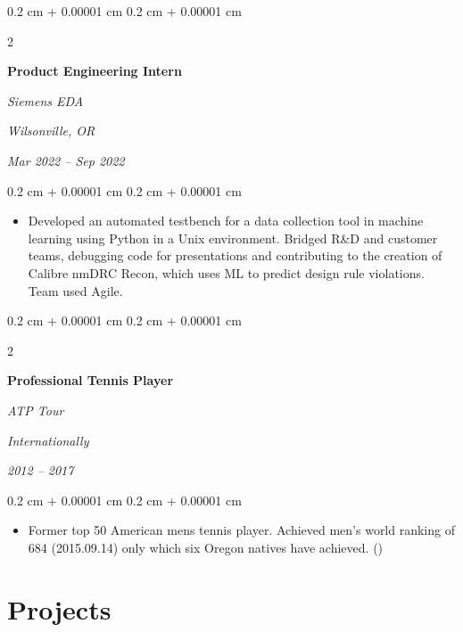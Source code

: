 \documentclass[10pt, letterpaper]{article}
\newenvironment{highlights}{
    \begin{itemize}[
        topsep=0.10 cm,
        parsep=0.10 cm,
        partopsep=0pt,
        itemsep=0pt,
        leftmargin=0.4 cm + 10pt
    ]
}{
    \end{itemize}
} %
\newenvironment{onecolentry}{
    \begin{adjustwidth}{
        0.2 cm + 0.00001 cm
    }{
        0.2 cm + 0.00001 cm
    }
}{
    \end{adjustwidth}
} %
\newenvironment{twocolentry}[2][]{
    \onecolentry
    \def\secondColumn{#2}
    \setcolumnwidth{\fill, 4.5 cm}
    \begin{paracol}{2}
}{
    \switchcolumn \raggedleft \secondColumn
    \end{paracol}
    \endonecolentry
} %
\let\hrefWithoutArrow\href
\renewcommand{\href}[2]{\hrefWithoutArrow{#1}{\ifthenelse{\equal{#2}{}}{ }{#2 }\raisebox{.15ex}{\footnotesize \faExternalLink*}}}
\begin{document}
        \begin{twocolentry}{
        \textit{Wilsonville, OR}    
            
        \textit{Mar 2022 – Sep 2022}}
            \textbf{Product Engineering Intern}
            
            \textit{Siemens EDA}
        \end{twocolentry}

        \vspace{0.10 cm}
        \begin{onecolentry}
            \begin{highlights}
                \item Developed an automated testbench for a data collection tool in machine learning using Python in a Unix environment. Bridged R\&D and customer teams, debugging code for presentations and contributing to the creation of Calibre nmDRC Recon, which uses ML to predict design rule violations. Team used Agile. 
            \end{highlights}
        \end{onecolentry}

        \vspace{0.2 cm}

        \begin{twocolentry}{
        \textit{Internationally}    
            
        \textit{2012 – 2017}}
            \textbf{Professional Tennis Player}
            
            \textit{ATP Tour}
        \end{twocolentry}

        \vspace{0.10 cm}
        \begin{onecolentry}
            \begin{highlights}
                \item Former top 50 American mens tennis player. Achieved men's world ranking of 684 (2015.09.14) only which six Oregon natives have achieved. (\href{https://www.atptour.com/en/players/mico-santiago/so75/overview}{link})
            \end{highlights}
        \end{onecolentry}
    \section{Projects}
\end{document}
